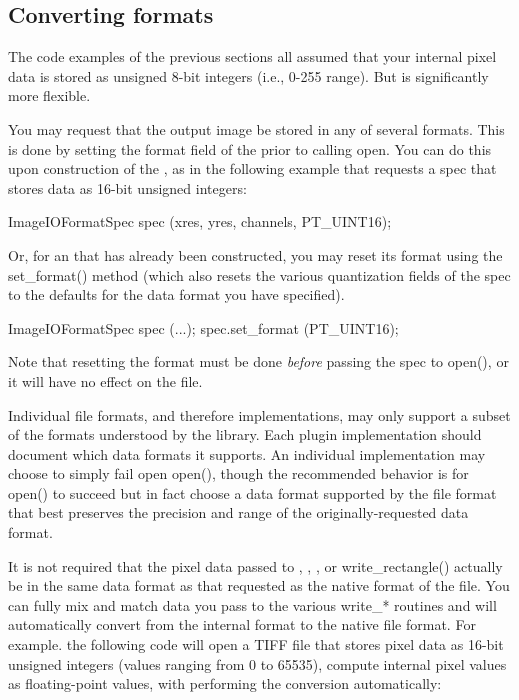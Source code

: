 \subsection{Converting formats}
\label{sec:imageoutput:convertingformats}

The code examples of the previous sections all assumed that your
internal pixel data is stored as unsigned 8-bit integers (i.e., 0-255
range).  But \product is significantly more flexible.  

You may request that the output image be stored in any of several
formats.  This is done by setting the {\kw format} field of the
\ImageIOFormatSpec prior to calling {\kw open}.  You can do this upon
construction of the \ImageIOFormatSpec, as in the following example
that requests a spec that stores data as 16-bit unsigned integers:
\begin{code}
        ImageIOFormatSpec spec (xres, yres, channels, PT_UINT16);
\end{code}

\noindent Or, for an \ImageIOFormatSpec that has already been
constructed, you may reset its format using the {\kw set_format()}
method (which also resets the various quantization fields of the
spec to the defaults for the data format you have specified).  

\begin{code}
        ImageIOFormatSpec spec (...);
        spec.set_format (PT_UINT16);
\end{code}

Note that resetting the format must be done \emph{before} passing the
spec to {\kw open()}, or it will have no effect on the file.

Individual file formats, and therefore \ImageOutput implementations, may
only support a subset of the formats understood by the \product library.
Each \ImageOutput plugin implementation should document which data
formats it supports.  An individual \ImageOutput implementation may
choose to simply fail open {\kw open()}, though the recommended behavior
is for {\kw open()} to succeed but in fact choose a data format
supported by the file format that best preserves the precision and range
of the originally-requested data format.

It is not required that the pixel data passed to \writeimage,
\writescanline, \writetile, or {\kw write_rectangle()} actually be in
the same data format as that requested as the native format of the file.
You can fully mix and match data you pass to the various {\kw write_*}
routines and \product will automatically convert from the internal
format to the native file format.  For example. the following code will
open a TIFF file that stores pixel data as 16-bit unsigned integers
(values ranging from 0 to 65535), compute internal pixel values as
floating-point values, with \writeimage performing the conversion
automatically:

